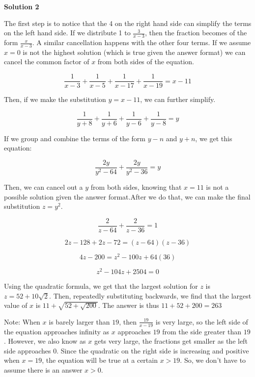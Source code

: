 \begin{enumerate}
 



\textbf{Solution 2}

The first step is to notice that the 4 on the right hand side can simplify the terms on the left hand side. If we distribute 1 to $\frac{3}{x-3}$, then the fraction becomes of the form $\frac{x}{x - 3}$. A similar cancellation happens with the other four terms. If we assume $x = 0$ is not the highest solution (which is true given the answer format) we can cancel the common factor of $x$ from both sides of the equation.

 
 \[\frac{1}{x - 3} + \frac{1}{x - 5} + \frac{1}{x - 17} + \frac{1}{x - 19} = x - 11\]

 Then, if we make the substitution $y = x - 11$, we can further simplify.

 
 \[\frac{1}{y + 8} + \frac{1}{y + 6} + \frac{1}{y - 6} + \frac{1}{y - 8} =y\]

 If we group and combine the terms of the form  $y - n$ and   $y + n$, we get this equation:

 
 \[\frac{2y}{y^2 - 64} + \frac{2y}{y^2 - 36} = y\]

 Then, we can cancel out a $y$ from both sides, knowing that $x = 11$ is not a possible solution given the answer format.After we do that, we can make the final substitution $z = y^2$.

 
 \[\frac{2}{z - 64} + \frac{2}{z - 36} = 1\]

 \[2z - 128 + 2z - 72 = (z - 64)(z - 36)\]

 \[4z -  200 = z^2 - 100z + 64(36)\]

 \[z^2 - 104z + 2504 = 0\]

 Using the quadratic formula, we get that the largest solution for $z$ is $z = 52 + 10\sqrt{2}$. Then, repeatedly substituting backwards, we find that the largest value of $x$ is $11 + \sqrt{52 + \sqrt{200}}$. The answer is thus $11 + 52 + 200 = \boxed{263}$

 
Note: When $x$ is barely larger than $19$, then $\frac{19}{x-19}$ is very large, so the left side of the equation approaches infinity as $x$ approaches $19$ from the side greater than $19$. However, we also know as $x$ gets very large, the fractions get smaller as the left side approaches $0$. Since the quadratic on the right side is increasing and positive when $x=19$, the equation will be true at a certain $x>19.$ So, we don't have to assume there is an answer $x>0.$





\end{enumerate}
